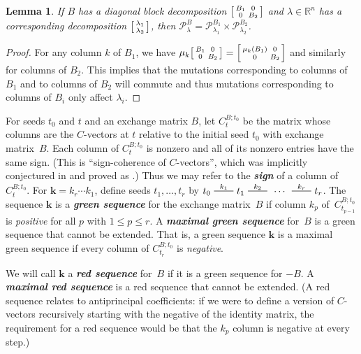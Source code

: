 \documentclass[10pt]{article}
\newtheorem{lemma}[proposition]{Lemma}
\theoremstyle{definition}
\theoremstyle{remark}
\numberwithin{equation}{section}
\newcommand{\newword}[1]{\textbf{\emph{#1}}}
\newcommand{\reals}{\mathbb R}
\newcommand{\edge}{\,\,\rule[2.7pt]{20pt}{0.5pt}\,\,}
\newcommand{\0}{{\mathbf{0}}}
\newcommand{\kk}{{\boldsymbol{k}}}
\renewcommand{\P}{\mathcal{P}}
\begin{document}
\begin{lemma}\label{block dom}
If $B$ has a diagonal block decomposition $\begin{bsmallmatrix}B_1&0\\0&B_2\end{bsmallmatrix}$ and $\lambda\in\reals^n$ has a corresponding decomposition $\begin{bsmallmatrix}\lambda_1\\\lambda_2\end{bsmallmatrix}$, then $\P_\lambda^B=\P_{\lambda_1}^{B_1}\times\P_{\lambda_2}^{B_2}$.
\end{lemma}
\begin{proof}
  For any column $k$ of $B_1$, we have $\mu_k\begin{bsmallmatrix}B_1&0\\0&B_2\end{bsmallmatrix}=\begin{bsmallmatrix}\mu_k(B_1)&0\\0&B_2\end{bsmallmatrix}$ and similarly for columns of $B_2$.
  This implies that the mutations corresponding to columns of $B_1$ and to columns of $B_2$ will commute and thus mutations corresponding to columns of $B_i$ only affect $\lambda_i$.
\end{proof}

For seeds $t_0$ and $t$ and an exchange matrix $B$, let $C_t^{B;t_0}$ be the matrix whose columns are the $C$-vectors at $t$ relative to the initial seed $t_0$ with exchange matrix~$B$.
Each column of $C_t^{B;t_0}$ is nonzero and all of its nonzero entries have the same sign.
(This is ``sign-coherence of $C$-vectors'', which was implicitly conjectured in \cite{ca4} and proved as \cite[Corollary~5.5]{GHKK}.)
Thus we may refer to the \newword{sign} of a column of $C_t^{B;t_0}$.
For $\kk=k_r\cdots k_1$, define seeds $t_1,\ldots,t_r$ by $t_0\overset{k_1}{\edge}t_1\overset{k_2}{\edge}\,\cdots\,\overset{k_r}{\edge}t_r$.
The sequence $\kk$ is a \newword{green sequence} for the exchange matrix~$B$ if column $k_p$ of~$C_{t_{p-1}}^{B;t_0}$ is \emph{positive} for all $p$ with $1\le p\le r$.
A \newword{maximal green sequence} for~$B$ is a green sequence that cannot be extended.
That is, a green sequence $\kk$ is a maximal green sequence if every column of $C_{t_r}^{B;t_0}$ is \emph{negative}.

We will call $\kk$ a \newword{red sequence} for~$B$ if it is a green sequence for $-B$.
A \newword{maximal red sequence} is a red sequence that cannot be extended.
(A red sequence relates to antiprincipal coefficients: 
if we were to define a version of $C$-vectors recursively starting with the negative of the identity matrix, the requirement for a red sequence would be that the $k_p$ column is negative at every step.)
\end{document}
